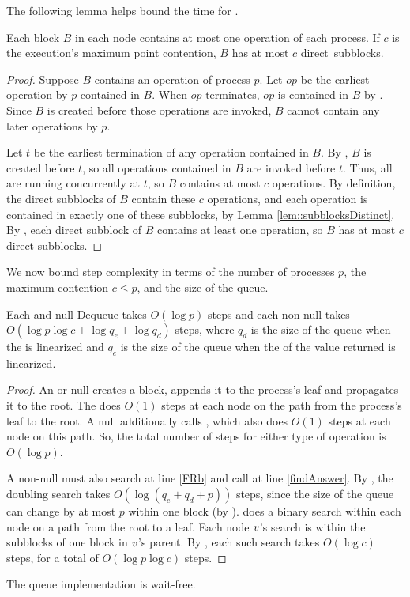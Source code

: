 The following lemma helps bound the time for .
\begin{lemma}\label{blockSize}
Each block $B$ in each node contains at most one operation of each process.
If $c$ is the execution's maximum point contention, $B$ has at most $c$ direct~subblocks.
\end{lemma}
\begin{proof}
Suppose $B$ contains an operation of process $p$.
Let $op$ be the earliest operation by $p$ contained in $B$.
When $op$ terminates, $op$ is contained in $B$ by .
Since $B$ is created before
those operations are invoked, $B$ cannot contain any later operations by $p$.

Let $t$ be the earliest termination of any operation contained in $B$.
By , $B$ is created before $t$, so all operations contained in $B$
are invoked before $t$.  Thus, all are  running concurrently at $t$, so $B$ contains at most $c$ operations.
By definition, the direct subblocks of $B$ contain these $c$ operations, and each operation is contained
in exactly one of these subblocks, by Lemma \ref{lem::subblocksDistinct}.
By , each direct subblock of $B$ contains at least one operation,
so $B$ has at most $c$ direct subblocks.
\end{proof}

We now bound step complexity in terms of the number of processes $p$, the maximum contention $c\leq p$, and the size of the queue. 

\begin{mytheorem}\label{enqDeqTime}
Each  and null Dequeue takes $O(\log p)$ steps 
and each non-null  takes
$O(\log p\log c + \log q_e+ \log q_d)$ steps,
where $q_d$ is the size of the queue when the  is linearized and 
$q_e$ is the size of the queue when the  of the value returned is linearized.
\end{mytheorem}
\begin{proof}
An  or null  creates a block, appends it to the process's 
leaf and propagates it to the root.  The   does $O(1)$ steps 
at each node on the path from the process's leaf to the root.
A null  additionally calls , which also does $O(1)$ steps
at each node on this path. 
So, the total number of steps for either type of operation is $O(\log p)$.

A non-null  must also search at line \ref{FRb} and call 
at line \ref{findAnswer}.
By , the doubling search takes $O(\log(q_e+q_d+p))$ steps,
since the size of the queue can change by at most $p$ within one block (by ).
 does a binary search within each node on a path from the root to a leaf.
Each node $\mbox{\textnormal{\textit{v}}}$'s search is within the subblocks of one block in $\mbox{\textnormal{\textit{v}}}$'s parent.
By , each such search takes $O(\log c)$ steps, for a total of $O(\log p\log c)$ steps.
\end{proof}

\begin{corollary}
The queue implementation is wait-free.
\end{corollary}
